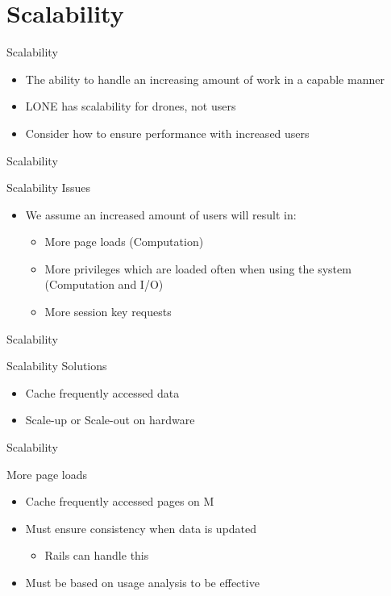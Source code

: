 \author{Esben Pilgaard M\o{}ller}

\section{Scalability}
\begin{frame}{Scalability}{}
  \begin{itemize}
  	\item The ability to handle an increasing amount of work in a capable manner
  	\item LONE has scalability for drones, not users
  	\item Consider how to ensure performance with increased users
  \end{itemize}
\end{frame}

\begin{frame}{Scalability}{}
\begin{block}{Scalability Issues}
  \begin{itemize}
    \item We assume an increased amount of users will result in:
    \begin{itemize}
			\item More page loads (Computation)
			\item More privileges which are loaded often when using the system (Computation and I/O)
			\item More session key requests
		\end{itemize}
  \end{itemize}
\end{block}
\end{frame}

\begin{frame}{Scalability}{}
\begin{block}{Scalability Solutions}
  \begin{itemize}
    \item Cache frequently accessed data
    \item Scale-up or Scale-out on hardware
  \end{itemize}
\end{block}
\end{frame}



\begin{frame}{Scalability}{}
\begin{block}{More page loads}
  \begin{itemize}
    \item Cache frequently accessed pages on M
    \item Must ensure consistency when data is updated
    	\begin{itemize}
				\item Rails can handle this
			\end{itemize}
		\item Must be based on usage analysis to be effective
  \end{itemize}
\end{block}
\end{frame}

